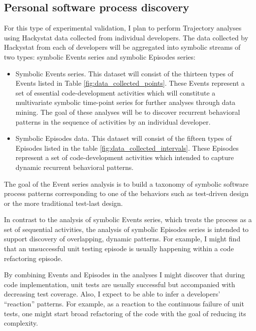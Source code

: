 \subsection{Personal software process discovery}
For this type of experimental validation, I plan to perform Trajectory analyses using Hackystat data collected from individual developers. The data collected by Hackystat from each of developers will be aggregated into symbolic streams of two types: symbolic Events series and symbolic Episodes series:
\begin{itemize}
	\item Symbolic Events series. This dataset will consist of the thirteen types of Events listed in Table \ref{fig:data_collected_points}. These Events represent a set of essential code-development activities which will constitute a multivariate symbolic time-point series for further analyses through data mining. The goal of these analyses will be to discover recurrent behavioral patterns in the sequence of activities by an individual developer. 
	\item Symbolic Episodes data. This dataset will consist of the fifteen types of Episodes listed in the table \ref{fig:data_collected_intervals}. These Episodes represent a set of code-development activities which intended to capture dynamic recurrent behavioral patterns.
\end{itemize}

The goal of the Event series analysis is to build a taxonomy of symbolic software process patterns corresponding to one of the behaviors such as test-driven design or the more traditional test-last design.

In contrast to the analysis of symbolic Events series, which treats the process as a set of sequential activities, the analysis of symbolic Episodes series is intended to support discovery of overlapping, dynamic patterns. For example, I might find that an unsuccessful unit testing episode is usually happening within a code refactoring episode. 

By combining Events and Episodes in the analyses I might discover that during code implementation, unit tests are usually successful but accompanied with decreasing test coverage. Also, I expect to be able to infer a developers' ``reaction'' patterns. For example, as a reaction to the continuous failure of unit tests, one might start broad refactoring of the code with the goal of reducing its complexity. 

